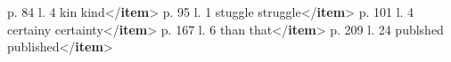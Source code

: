 \begin{shaded}
\hspace*{1em}\hspace*{1em}\hspace*{1em}\hspace*{1em}\hspace*{1em}p. 84 l. 4 kin kind{</\textbf{item}>}\mbox{}\newline 
\hspace*{1em}\hspace*{1em}\hspace*{1em}\hspace*{1em}\hspace*{1em}p. 95 l. 1 stuggle struggle{</\textbf{item}>}\mbox{}\newline 
\hspace*{1em}\hspace*{1em}\hspace*{1em}\hspace*{1em}\hspace*{1em}p. 101 l. 4 certainy certainty{</\textbf{item}>}\mbox{}\newline 
\hspace*{1em}\hspace*{1em}\hspace*{1em}\hspace*{1em}\hspace*{1em}p. 167 l. 6 than that{</\textbf{item}>}\mbox{}\newline 
\hspace*{1em}\hspace*{1em}\hspace*{1em}\hspace*{1em}\hspace*{1em}p. 209 l. 24 publshed published{</\textbf{item}>}\mbox{}\newline 
\hspace*{1em}\hspace*{1em}\hspace*{1em}\hspace*{1em}\mbox{}\newline 
\hspace*{1em}\hspace*{1em}\hspace*{1em}\mbox{}\newline 

\end{shaded}
